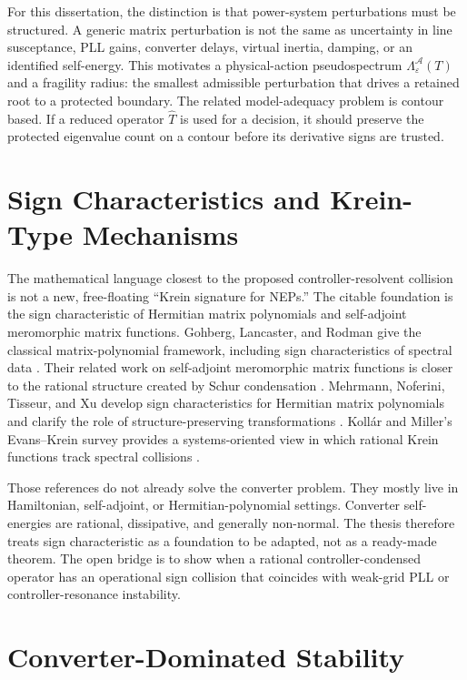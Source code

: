 For this dissertation, the distinction is that power-system perturbations must
be structured. A generic matrix perturbation is not the same as uncertainty in
line susceptance, PLL gains, converter delays, virtual inertia, damping, or an
identified self-energy. This motivates a physical-action pseudospectrum
\(\Lambda_\varepsilon^{\mathcal A}(T)\) and a fragility radius: the smallest
admissible perturbation that drives a retained root to a protected boundary.
The related model-adequacy problem is contour based. If a reduced operator
\(\widehat T\) is used for a decision, it should preserve the protected
eigenvalue count on a contour before its derivative signs are trusted.

\section{Sign Characteristics and Krein-Type Mechanisms}

The mathematical language closest to the proposed controller-resolvent
collision is not a new, free-floating ``Krein signature for NEPs.'' The citable
foundation is the sign characteristic of Hermitian matrix polynomials and
self-adjoint meromorphic matrix functions. Gohberg, Lancaster, and Rodman give
the classical matrix-polynomial framework, including sign characteristics of
spectral data \cite{gohberg1982matrixpolynomials}. Their related work on
self-adjoint meromorphic matrix functions is closer to the rational structure
created by Schur condensation \cite{gohberg1983meromorphic}. Mehrmann,
Noferini, Tisseur, and Xu develop sign characteristics for Hermitian matrix
polynomials and clarify the role of structure-preserving transformations
\cite{mehrmann2016sign}. Kollár and Miller's Evans--Krein survey provides a
systems-oriented view in which rational Krein functions track spectral
collisions \cite{kollar2014graphical}.

Those references do not already solve the converter problem. They mostly live
in Hamiltonian, self-adjoint, or Hermitian-polynomial settings. Converter
self-energies are rational, dissipative, and generally non-normal. The thesis
therefore treats sign characteristic as a foundation to be adapted, not as a
ready-made theorem. The open bridge is to show when a rational
controller-condensed operator has an operational sign collision that coincides
with weak-grid PLL or controller-resonance instability.

\section{Converter-Dominated Stability}

